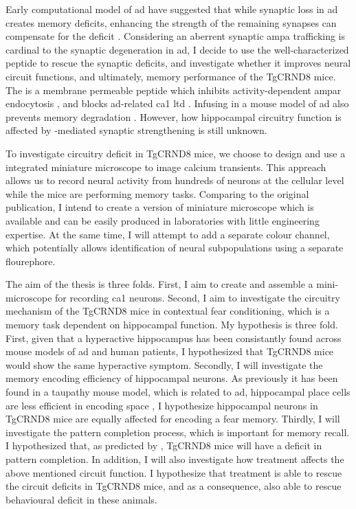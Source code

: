 Early computational model of \gls{ad} have suggested that while synaptic loss in \gls{ad} creates memory deficits, enhancing the strength of the remaining synapses can compensate for the deficit \citep{horn93}. Considering an aberrent synaptic \gls{ampa} trafficking is cardinal to the synaptic degeneration in \gls{ad}, I decide to use the well-characterized peptide \tglu to rescue the synaptic deficits, and investigate whether it improves neural circuit functions, and ultimately, memory performance of the TgCRND8 mice. The \tglu is a membrane permeable peptide which inhibits activity-dependent \gls{ampar} endocytosis \citep{ahmadian04}, and blocks \gls{ad}-related \gls{ca1} \gls{ltd} \citep{dong15}. Infusing \tglu in a mouse model of \gls{ad} also prevents memory degradation \citep{dong15}. However, how hippocampal circuitry function is affected by \tglu-mediated synaptic strengthening is still unknown. 

To investigate circuitry deficit in TgCRND8 mice, we choose to design and use a integrated miniature microscope to image calcium transients. This appreach allows us to record neural activity from hundreds of neurons at the cellular level while the mice are performing memory tasks. Comparing to the original \citet{ghosh11} publication, I intend to create a version of miniature microscope which is available and can be easily produced in laboratories with little engineering expertise. At the same time, I will attempt to add a separate colour channel, which potentially allows identification of neural subpopulations using a separate flourephore. 

The aim of the thesis is three folds. First, I aim to create and assemble a mini-microscope for recording \gls{ca1} neurons. Second, I aim to investigate the circuitry mechanism of the TgCRND8 mice in contextual fear conditioning, which is a memory task dependent on hippocampal function. My hypothesis is three fold. First, given that a hyperactive hippocampus has been consistantly found across mouse models of \gls{ad} and human patients, I hypothesized that TgCRND8 mice would show the same hyperactive symptom. Secondly, I will investigate the memory encoding efficiency of hippocampal neurons. As previously it has been found in a taupathy mouse model, which is related to \gls{ad}, hippocampal place cells are less efficient in encoding space \citep{cheng13, ciupek15}, I hypothesize hippocampal neurons in TgCRND8 mice are equally affected for encoding a fear memory. Thirdly, I will investigate the pattern completion process, which is important for memory recall. I hypothesized that, as predicted by \citet{horn93}, TgCRND8 mice will have a deficit in pattern completion. In addition, I will also investigate how \tglu treatment affects the above mentioned circuit function. I hypothesize that \tglu treatment is able to rescue the circuit deficits in TgCRND8 mice, and as a consequence, also able to rescue behavioural deficit in these animals. 

